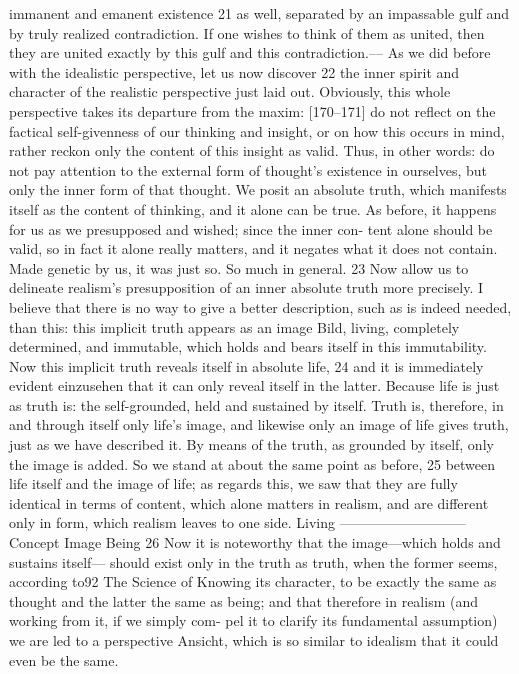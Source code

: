 immanent and emanent existence 21 as well, separated by an impassable gulf
and by truly realized contradiction. If one wishes to think of them as united,
then they are united exactly by this gulf and this contradiction.—
As we did before with the idealistic perspective, let us now discover 22 the
inner spirit and character of the realistic perspective just laid out. Obviously,
this whole perspective takes its departure from the maxim: [170–171] do not
reflect on the factical self-givenness of our thinking and insight, or on how this
occurs in mind, rather reckon only the content of this insight as valid. Thus, in
other words: do not pay attention to the external form of thought’s existence in
ourselves, but only the inner form of that thought. We posit an absolute truth,
which manifests itself as the content of thinking, and it alone can be true. As
before, it happens for us as we presupposed and wished; since the inner con-
tent alone should be valid, so in fact it alone really matters, and it negates what
it does not contain. Made genetic by us, it was just so. So much in general. 23
Now allow us to delineate realism’s presupposition of an inner absolute
truth more precisely. I believe that there is no way to give a better description,
such as is indeed needed, than this: this implicit truth appears as an image
{Bild}, living, completely determined, and immutable, which holds and bears
itself in this immutability. Now this implicit truth reveals itself in absolute life, 24
and it is immediately evident {einzusehen} that it can only reveal itself in the
latter. Because life is just as truth is: the self-grounded, held and sustained by
itself. Truth is, therefore, in and through itself only life’s image, and likewise
only an image of life gives truth, just as we have described it. By means of the
truth, as grounded by itself, only the image is added. So we stand at about the
same point as before, 25 between life itself and the image of life; as regards this,
we saw that they are fully identical in terms of content, which alone matters
in realism, and are different only in form, which realism leaves to one side.
Living
—————————
Concept Image Being 26
Now it is noteworthy that the image—which holds and sustains itself—
should exist only in the truth as truth, when the former seems, according to92
The Science of Knowing
its character, to be exactly the same as thought and the latter the same as
being; and that therefore in realism (and working from it, if we simply com-
pel it to clarify its fundamental assumption) we are led to a perspective
{Ansicht}, which is so similar to idealism that it could even be the same.
